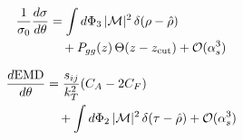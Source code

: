 \begin{align}
  \frac{1}{\sigma_0} \frac{d\sigma}{d\theta} &= \int d\Phi_{3} \, |\mathcal{M}|^2 \, \delta(\rho - \hat{\rho}) \nonumber \\
  &\quad + P_{gg}(z) \, \Theta(z - z_{\rm cut}) + \mathcal{O}(\alpha_s^3) \label{eq:4}
\end{align}

\begin{align}
  \frac{d \mathrm{EMD}}{d \theta} &= \frac{s_{ij}}{k_T^2} (C_A - 2C_F) \nonumber \\
  &\quad + \int d\Phi_{2} \, |\mathcal{M}|^2 \, \delta(\tau - \hat{\rho}) + \mathcal{O}(\alpha_s^3) \label{eq:5}
\end{align}

